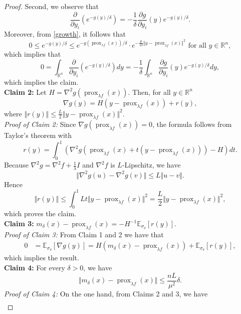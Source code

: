 \documentclass[11pt]{amsart}
\newcommand{\1}{\mathds{1}}
\theoremstyle{definition}
\theoremstyle{remark}
\theoremstyle{definition}
\begin{document}
\begin{proof}
Second, we observe that
$$
\frac{\partial }{\partial y_i}\left(e^{-g(y)/\delta}\right)=-\frac{1}{\delta}\frac{\partial g}{\partial y_i} (y)e^{-g(y)/\delta}.
$$
Moreover, from \eqref{growth}, it follows that  
$$
0\leq e^{-g(y)/\delta}\leq e^{-g(\operatorname{prox}_{\lambda f}(x))/\delta}\cdot e^{-\frac{\mu}{2\delta}\Vert y-\operatorname{prox}_{\lambda f}(x)\Vert^2} \textrm{ for all } y\in \mathbb{R}^n,
$$
which implies that
$$
0=\int_{\mathbb{R}^n}  \frac{\partial }{\partial y_i}\left(e^{-g(y)/\delta}\right)dy=-\frac{1}{\delta} \int_{\mathbb{R}^n} \frac{\partial g}{\partial y_i} (y)e^{-g(y)/\delta} dy,
$$
which implies the claim.\\
\textbf{Claim 2:} Let $H=\nabla^2 g(\operatorname{prox}_{\lambda f}(x))$. Then, for all $y\in \mathbb{R}^n$
$$
\nabla g(y)=H(y-\operatorname{prox}_{\lambda f}(x))+r(y), 
$$
where $\Vert r(y)\Vert \leq \frac{L}{2}\Vert y-\operatorname{prox}_{\lambda f}(x)\Vert^2$.\\
\emph{Proof of Claim 2:} Since $\nabla g(\operatorname{prox}_{\lambda f}(x))=0$, the formula follows from Taylor's theorem with
$$
r(y)=\int_0^1 (\nabla^2 g(\operatorname{prox}_{\lambda f}(x)+t(y-\operatorname{prox}_{\lambda f}(x)))-H)dt.
$$
Because $\nabla^2 g=\nabla^2 f+\frac{1}{\lambda}I$ and $\nabla^2 f$ is $L$-Lipschitz, we have
$$
\Vert \nabla^2 g(u)-\nabla^2 g(v)\Vert \leq L\Vert u-v\Vert.
$$
Hence
$$
\Vert r(y)\Vert \leq \int_0^1 Lt\Vert y-\operatorname{prox}_{\lambda f}(x)\Vert^2=\frac{L}{2}\Vert y-\operatorname{prox}_{\lambda f}(x)\Vert^2,
$$
which proves the claim. \\
\textbf{Claim 3:} $m_{\delta}(x)-\operatorname{prox}_{\lambda f}(x)=-H^{-1}\mathbb{E}_{\sigma_{\delta}}[r(y)]$.\\
\emph{Proof of Claim 3:} From Claim 1 and 2 we have that
\begin{equation*}
\begin{aligned}
0&=\mathbb{E}_{\sigma_{\delta}}[ \nabla g(y)]=H(m_{\delta}(x)-\operatorname{prox}_{\lambda f}(x))+\mathbb{E}_{\sigma_{\delta}}[r(y)],
\end{aligned}
\end{equation*}
which implies the result.\\
\textbf{Claim 4:} For every $\delta>0$, we have 
$$\Vert m_{\delta}(x)-\operatorname{prox}_{\lambda f}(x)\Vert \leq \frac{nL}{\mu^2}\delta.$$
\emph{Proof of Claim 4:} On the one hand, from Claims 2 and 3,  we have
\begin{equation}\label{cota-inicial}
    \begin{aligned}

\end{aligned}
\end{equation}
\end{proof}
\end{document}
